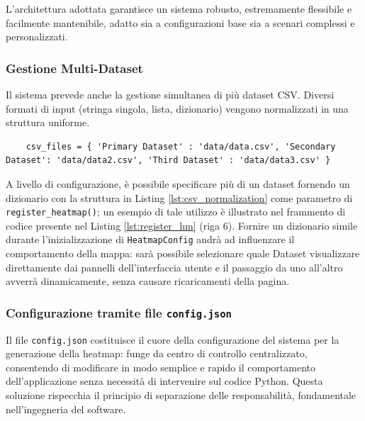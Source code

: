 \noindent
L'architettura adottata garantisce un sistema robusto, estremamente flessibile e
facilmente mantenibile, adatto sia a configurazioni base sia a scenari complessi
e personalizzati.

\subsubsection{Gestione Multi-Dataset}
Il sistema prevede anche la gestione simultanea di più dataset CSV. Diversi formati
di input (stringa singola, lista, dizionario) vengono normalizzati in una struttura
uniforme.

\begin{listing}
  [H]
  \caption{Dizionario multi-CSV} %
  \label{lst:csv_normalization} %
  \begin{verbatim}
    csv_files = { 'Primary Dataset' : 'data/data.csv', 'Secondary Dataset': 'data/data2.csv', 'Third Dataset' : 'data/data3.csv' }
  \end{verbatim}
\end{listing}

A livello di configurazione, è possibile specificare più di un dataset fornendo un
dizionario con la struttura in Listing \ref{lst:csv_normalization} come parametro
di \texttt{register\_heatmap()}; un esempio di tale utilizzo è illustrato nel frammento
di codice presente nel Listing \ref{lst:register_hm} (riga 6). Fornire un
dizionario simile durante l'inizializzazione di \texttt{HeatmapConfig} andrà ad influenzare
il comportamento della mappa: sarà possibile selezionare quale Dataset
visualizzare direttamente dai pannelli dell'interfaccia utente e il passaggio da
uno all'altro avverrà dinamicamente, senza causare ricaricamenti della pagina.

\subsubsection{Configurazione tramite file \texttt{config.json}}

Il file \texttt{config.json} costituisce il cuore della configurazione del sistema
per la generazione della heatmap: funge da centro di controllo centralizzato, consentendo
di modificare in modo semplice e rapido il comportamento dell'applicazione senza
necessità di intervenire sul codice Python. Questa soluzione rispecchia il
principio di separazione delle responsabilità, fondamentale nell'ingegneria del software.

